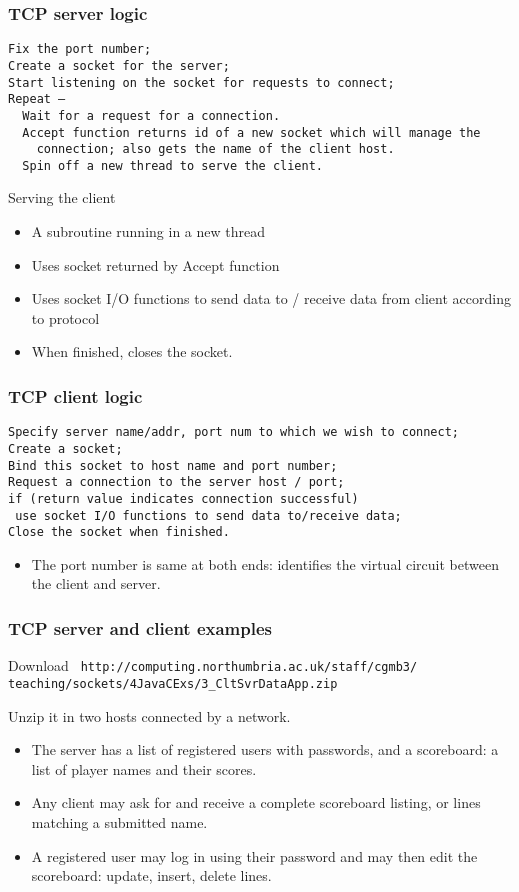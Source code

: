 \documentclass[10pt, hyperref={pdfpagelabels=false}]{beamer}
\begin{document}
\begin{frame} [fragile]
\frametitle{TCP server logic}
{\color{blue}
\begin{verbatim}
Fix the port number;
Create a socket for the server;
Start listening on the socket for requests to connect;
Repeat –
  Wait for a request for a connection.
  Accept function returns id of a new socket which will manage the
    connection; also gets the name of the client host.
  Spin off a new thread to serve the client.
\end{verbatim}
}

Serving the client
\begin{itemize}
\item A subroutine running in a new thread
\item Uses socket returned by Accept function
\item Uses socket I/O functions to send data to / receive data from client according to protocol
\item When finished, closes the socket.
\end{itemize}
\end{frame}

\begin{frame} [fragile]
\frametitle{TCP client logic}
{\color{blue}
\begin{verbatim}
Specify server name/addr, port num to which we wish to connect;
Create a socket;
Bind this socket to host name and port number;
Request a connection to the server host / port;
if (return value indicates connection successful)
 use socket I/O functions to send data to/receive data;
Close the socket when finished.
\end{verbatim}
}
\begin{itemize}
\item The port number is same at both ends: 
  identifies the virtual circuit between the client and server.
\end{itemize}
\end{frame}

\begin{frame}
\frametitle{TCP server and client examples}
Download \texttt{\color{blue} \small http://computing.northumbria.ac.uk/staff/cgmb3/\\teaching/sockets/4JavaCExs/3\_CltSvrDataApp.zip}

Unzip it in two hosts connected by a network.
\begin{itemize}
\item The server has a list of registered users with passwords, and a scoreboard: a list of player names and their scores.
\item Any client may ask for and receive a complete scoreboard listing, or lines matching a submitted name.
\item A registered user may log in using their password and may then edit the scoreboard: update, insert, delete lines.
\end{itemize}
\end{frame}
\end{document}
